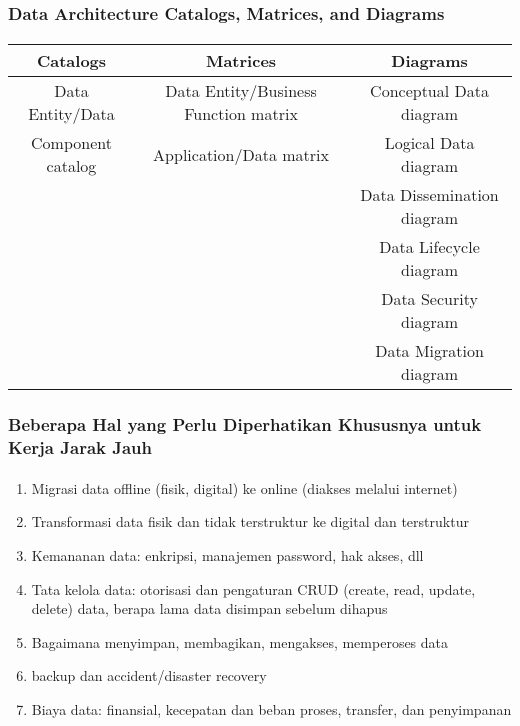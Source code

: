 \documentclass[aspectratio=169, table]{beamer}
\begin{document}
	
	\begin{frame}
		\frametitle{ Data Architecture Catalogs, Matrices, and Diagrams}
		\framesubtitle{\hspace{1cm}}
		\begin{table}[]
			\begin{tabular}{|c|c|c|}
				\hline
				\textbf{Catalogs} & \textbf{Matrices}   & \textbf{Diagrams} \\ \hline
				Data Entity/Data                   & Data Entity/Business Function matrix & Conceptual Data diagram            \\ 
				Component catalog                  & Application/Data matrix              & Logical Data diagram               \\
				&                                      & Data Dissemination diagram         \\
				&                                      & Data Lifecycle diagram             \\
				&                                      & Data Security diagram              \\
				&                                      & Data Migration diagram             \\ \hline
			\end{tabular}
		\end{table}
	\end{frame}
	
	
	\begin{frame}
		\frametitle{Beberapa Hal yang Perlu Diperhatikan Khususnya untuk Kerja Jarak Jauh}
		\framesubtitle{\hspace{1cm}}
		\begin{enumerate}
			\item Migrasi data offline (fisik, digital) ke online (diakses melalui internet)
			\item Transformasi data fisik dan tidak terstruktur ke digital dan terstruktur
			\item Kemananan data: enkripsi, manajemen password, hak akses, dll
			\item Tata kelola data: otorisasi dan pengaturan CRUD (create, read, update, delete) data, berapa lama data disimpan sebelum dihapus
			\item Bagaimana menyimpan, membagikan, mengakses, memperoses data
			\item backup dan accident/disaster recovery
			\item Biaya data: finansial, kecepatan dan beban proses, transfer, dan penyimpanan
		\end{enumerate}
	\end{frame}
	
\end{document}
